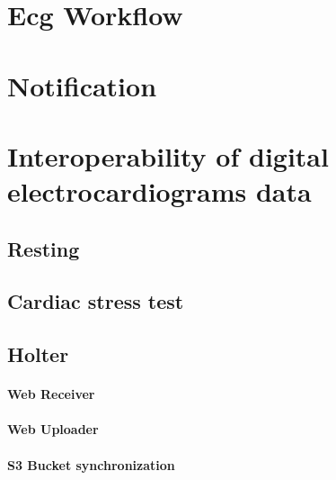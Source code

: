 \section{Ecg Workflow}
\section{Notification}
\section{Interoperability of digital electrocardiograms data}
\subsection{Resting}
\subsection{Cardiac stress test}
\subsection{Holter}
\paragraph{Web Receiver}
\paragraph{Web Uploader}
\paragraph{S3 Bucket synchronization}